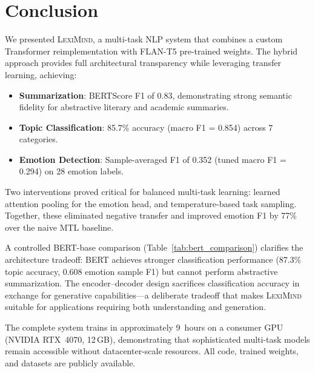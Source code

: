 \documentclass[11pt,a4paper]{article}
\newcommand{\lexiname}{\textsc{LexiMind}}
\newcommand{\tflant}{FLAN-T5}
\begin{document}
\section{Conclusion}
\label{sec:conclusion}

We presented \lexiname{}, a multi-task NLP system that combines a custom Transformer reimplementation with \tflant{} pre-trained weights.
The hybrid approach provides full architectural transparency while leveraging transfer learning, achieving:

\begin{itemize}[nosep]
    \item \textbf{Summarization}: BERTScore F1 of 0.83, demonstrating strong semantic fidelity for abstractive literary and academic summaries.
    \item \textbf{Topic Classification}: 85.7\% accuracy (macro F1 = 0.854) across 7 categories.
    \item \textbf{Emotion Detection}: Sample-averaged F1 of 0.352 (tuned macro F1 = 0.294) on 28 emotion labels.
\end{itemize}

Two interventions proved critical for balanced multi-task learning: learned attention pooling for the emotion head, and temperature-based task sampling.
Together, these eliminated negative transfer and improved emotion F1 by 77\% over the naive MTL baseline.

A controlled BERT-base comparison (Table~\ref{tab:bert_comparison}) clarifies the architecture tradeoff: BERT achieves stronger classification performance (87.3\% topic accuracy, 0.608 emotion sample F1) but cannot perform abstractive summarization.
The encoder--decoder design sacrifices classification accuracy in exchange for generative capabilities---a deliberate tradeoff that makes \lexiname{} suitable for applications requiring both understanding and generation.

The complete system trains in approximately 9~hours on a consumer GPU (NVIDIA RTX~4070, 12\,GB), demonstrating that sophisticated multi-task models remain accessible without datacenter-scale resources.
All code, trained weights, and datasets are publicly available.

\end{document}
